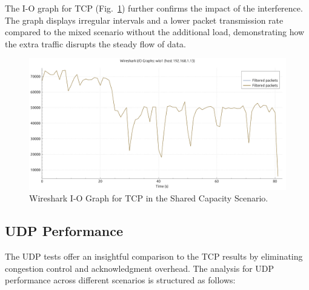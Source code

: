 \begin{enumerate}
                The I-O graph for TCP (Fig.~\ref{fig:io-mitm-tcp}) further confirms the impact of the interference. 
                The graph displays irregular intervals and a lower packet transmission rate compared to the mixed scenario without the additional load, demonstrating how the extra traffic disrupts the steady flow of data.

                \begin{figure}[ht]
                    \centering
                    \includegraphics[width=0.9\columnwidth]{images/graphs/I-O/I-O_MIX_MITM_TCP.pdf}
                    \caption{Wireshark I-O Graph for TCP in the Shared Capacity Scenario.}
                    \label{fig:io-mitm-tcp}
                \end{figure}

        \end{enumerate}

    \subsection{UDP Performance} \label{subsec:udp-performance}

        The UDP tests offer an insightful comparison to the TCP results by eliminating congestion control and acknowledgment overhead. The analysis for UDP performance across different scenarios is structured as follows:


